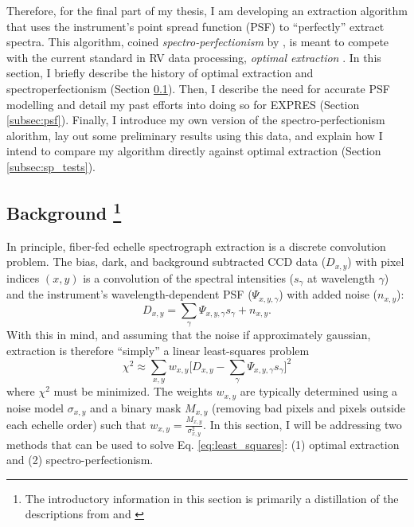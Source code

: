 \documentclass[11pt]{article}
\begin{document}
Therefore, for the final part of my thesis, I am developing an extraction algorithm that uses the instrument's point spread function (PSF) to ``perfectly'' extract spectra. This algorithm, coined \textit{spectro-perfectionism} by \citet{Bolton2009}, is meant to compete with the current standard in RV data processing, \textit{optimal extraction} \citep{Horne1986}. In this section, I briefly describe the history of optimal extraction and spectroperfectionism (Section \ref{subsec:spec_perf_intro}). Then, I describe the need for accurate PSF modelling and detail my past efforts into doing so for EXPRES (Section \ref{subsec:psf}). Finally, I introduce my own version of the spectro-perfectionism alorithm, lay out some preliminary results using this data, and explain how I intend to compare my algorithm directly against optimal extraction (Section \ref{subsec:sp_tests}).

\subsection{Background \footnote{The introductory information in this section is primarily a distillation of the descriptions from \citet{Zechmeister2013} and \citet{Bolton2009}}}
\label{subsec:spec_perf_intro}

In principle, fiber-fed echelle spectrograph extraction is a discrete convolution problem. The bias, dark, and background subtracted CCD data ($D_{x,y}$) with pixel indices $(x, y)$ is a convolution of the spectral intensities ($s_\gamma$ at wavelength $\gamma$) and the instrument's wavelength-dependent PSF ($\Psi_{x,y,\gamma}$) with added noise ($n_{x,y}$):
\begin{equation}
    D_{x,y} = \sum_\gamma \Psi_{x,y,\gamma} s_\gamma + n_{x,y}.
\label{eq:convolution}
\end{equation}
With this in mind, and assuming that the noise if approximately gaussian, extraction is therefore ``simply'' a linear least-squares problem
\begin{equation}
    \chi^2 \approx \sum_{x,y} w_{x,y} \bigg[D_{x,y} - \sum_\gamma \Psi_{x,y,\gamma} s_\gamma \bigg]^2
    \label{eq:least_squares}
\end{equation}
where $\chi^2$ must be minimized. The weights $w_{x,y}$ are typically determined using a noise model $\sigma_{x,y}$ and a binary mask $M_{x,y}$ (removing bad pixels and pixels outside each echelle order) such that $w_{x,y}=\frac{M_{x,y}}{\sigma^2_{x,y}}$. In this section, I will be addressing two methods that can be used to solve Eq. \ref{eq:least_squares}: (1) optimal extraction and (2) spectro-perfectionism.
\end{document}
